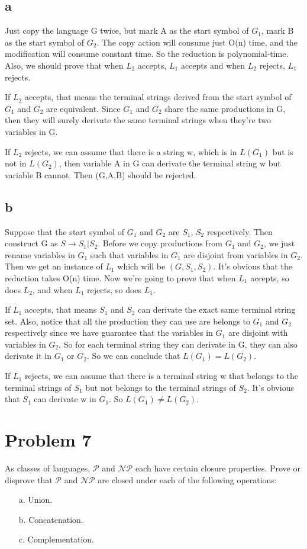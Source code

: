 \documentclass[a4paper,UTF8]{ctexart}
\theoremstyle{definition}
\begin{document}
\subsection*{a}
Just copy the language G twice, but mark A as the start symbol of $G_1$,
mark B as the start symbol of $G_2$. The copy action will consume just O(n) time,
and the modification will consume constant time. So the reduction is polynomial-time.
Also, we should prove that when $L_2$ accepts, $L_1$ accepts and when $L_2$ rejects, $L_1$ rejects.

If $L_2$ accepts, that means the terminal strings derived from the start symbol of $G_1$ and $G_2$
are equivalent. Since $G_1$ and $G_2$ share the same productions in G, then they will surely derivate
the same terminal strings when they're two variables in G.

If $L_2$ rejects, we can assume that there is a string w, which is in $L(G_1)$ but is not in $L(G_2)$,
then variable A in G can derivate the terminal string w but variable B cannot. Then (G,A,B) should be rejected.

\subsection*{b}
Suppose that the start symbol of $G_1$ and $G_2$ are $S_1$, $S_2$ respectively.
Then construct G as $S\rightarrow S_1|S_2$. Before we copy productions from $G_1$ and $G_2$, we 
just rename variables in $G_1$ such that variables in $G_1$ are disjoint from variables in $G_2$.
Then we get an instance of $L_1$ which will be $(G,S_1,S_2)$. It's obvious that the reduction takes
O(n) time. Now we're going to prove that when $L_1$ accepts, so does $L_2$,
 and when $L_1$ rejects, so does $L_1$.


If $L_1$ accepts, that means $S_1$ and $S_2$ can derivate the exact same terminal string set. 
Also, notice that all the production they can use are belongs to $G_1$ and $G_2$ respectively since
we have guarantee that the variables in $G_1$ are disjoint with variables in $G_2$. So for each terminal
string they can derivate in G, they can also derivate it in $G_1$ or $G_2$. So we can 
conclude that $L(G_1)=L(G_2)$.

If $L_1$ rejects, we can assume that there is a terminal string w that belongs to 
the terminal strings of $S_1$ but not belongs to the terminal strings of $S_2$. It's obvious that
$S_1$ can derivate w in $G_1$. So $L(G_1) \neq L(G_2)$.

\section*{Problem 7}
As classes of languages, $\mathcal{P}$ and $\mathcal{NP}$ each have certain closure properties.
 Prove or disprove that $\mathcal{P}$ and $\mathcal{NP}$ are closed under each of the following operations:
\begin{enumerate}
  \item[a.] Union.
  \item[b.] Concatenation.
  \item[c.] Complementation.
\end{enumerate}
\end{document}
